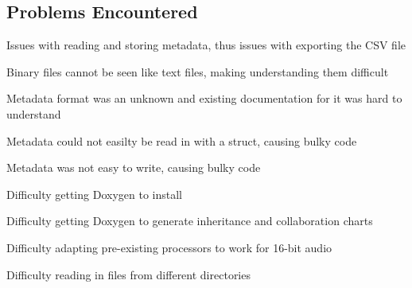 \subsection*{Problems Encountered}


\begin{DoxyItemize}
\item Issues with reading and storing metadata, thus issues with exporting the C\+SV file
\item Binary files cannot be seen like text files, making understanding them difficult
\item Metadata format was an unknown and existing documentation for it was hard to understand
\item Metadata could not easilty be read in with a struct, causing bulky code
\item Metadata was not easy to write, causing bulky code
\item Difficulty getting Doxygen to install
\item Difficulty getting Doxygen to generate inheritance and collaboration charts
\item Difficulty adapting pre-\/existing processors to work for 16-\/bit audio
\item Difficulty reading in files from different directories 
\end{DoxyItemize}